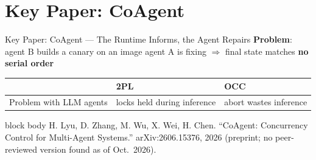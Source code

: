 \documentclass[aspectratio=169,11pt]{beamer}
\newcommand{\papercite}[1]{%
  \vfill
  \begin{beamercolorbox}[wd=\textwidth,sep=3pt]{block body}
    \tiny #1
  \end{beamercolorbox}}
\begin{document}
\section{Key Paper: CoAgent}
\begin{frame}{Key Paper: CoAgent --- The Runtime Informs, the Agent Repairs}
  \small\textbf{Problem}: agent B builds a canary on an image agent A is fixing $\Rightarrow$ final state matches \textbf{no serial order}
  \vspace{0.8em}

  \centering

  \vspace{0.8em}
  \small
  \begin{tabular}{lll}
    \toprule
    & 2PL & OCC \\
    \midrule
    Problem with LLM agents & locks held during inference & abort wastes inference \\
    \bottomrule
  \end{tabular}
  \papercite{H. Lyu, D. Zhang, M. Wu, X. Wei, H. Chen. ``CoAgent: Concurrency Control for Multi-Agent Systems.'' arXiv:2606.15376, 2026 (preprint; no peer-reviewed version found as of Oct.\ 2026).}
\end{frame}
\end{document}
